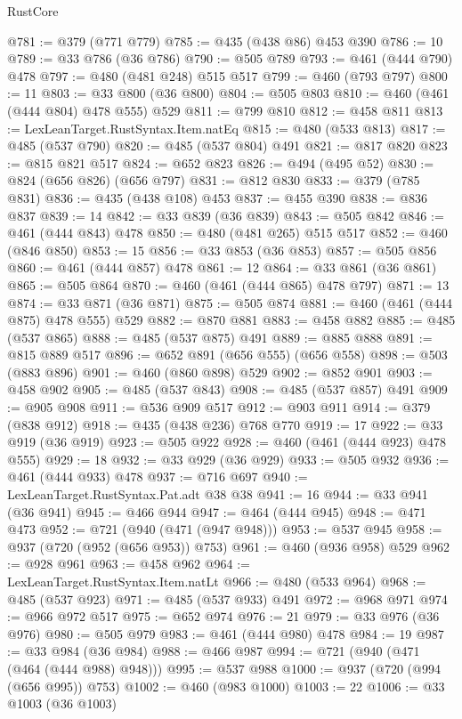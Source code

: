 \begin{lexlean}{RustCore}
\begin{coremodule}
@781 := @379 (@771 @779)
@785 := @435 (@438 @86) @453 @390
@786 := 10
@789 := @33 @786 (@36 @786)
@790 := @505 @789
@793 := @461 (@444 @790) @478
@797 := @480 (@481 @248) @515 @517
@799 := @460 (@793 @797)
@800 := 11
@803 := @33 @800 (@36 @800)
@804 := @505 @803
@810 := @460 (@461 (@444 @804) @478 @555) @529
@811 := @799 @810
@812 := @458 @811
@813 := LexLeanTarget.RustSyntax.Item.natEq
@815 := @480 (@533 @813)
@817 := @485 (@537 @790)
@820 := @485 (@537 @804) @491
@821 := @817 @820
@823 := @815 @821 @517
@824 := @652 @823
@826 := @494 (@495 @52)
@830 := @824 (@656 @826) (@656 @797)
@831 := @812 @830
@833 := @379 (@785 @831)
@836 := @435 (@438 @108) @453
@837 := @455 @390
@838 := @836 @837
@839 := 14
@842 := @33 @839 (@36 @839)
@843 := @505 @842
@846 := @461 (@444 @843) @478
@850 := @480 (@481 @265) @515 @517
@852 := @460 (@846 @850)
@853 := 15
@856 := @33 @853 (@36 @853)
@857 := @505 @856
@860 := @461 (@444 @857) @478
@861 := 12
@864 := @33 @861 (@36 @861)
@865 := @505 @864
@870 := @460 (@461 (@444 @865) @478 @797)
@871 := 13
@874 := @33 @871 (@36 @871)
@875 := @505 @874
@881 := @460 (@461 (@444 @875) @478 @555) @529
@882 := @870 @881
@883 := @458 @882
@885 := @485 (@537 @865)
@888 := @485 (@537 @875) @491
@889 := @885 @888
@891 := @815 @889 @517
@896 := @652 @891 (@656 @555) (@656 @558)
@898 := @503 (@883 @896)
@901 := @460 (@860 @898) @529
@902 := @852 @901
@903 := @458 @902
@905 := @485 (@537 @843)
@908 := @485 (@537 @857) @491
@909 := @905 @908
@911 := @536 @909 @517
@912 := @903 @911
@914 := @379 (@838 @912)
@918 := @435 (@438 @236) @768 @770
@919 := 17
@922 := @33 @919 (@36 @919)
@923 := @505 @922
@928 := @460 (@461 (@444 @923) @478 @555)
@929 := 18
@932 := @33 @929 (@36 @929)
@933 := @505 @932
@936 := @461 (@444 @933) @478
@937 := @716 @697
@940 := LexLeanTarget.RustSyntax.Pat.adt @38 @38
@941 := 16
@944 := @33 @941 (@36 @941)
@945 := @466 @944
@947 := @464 (@444 @945)
@948 := @471 @473
@952 := @721 (@940 (@471 (@947 @948)))
@953 := @537 @945
@958 := @937 (@720 (@952 (@656 @953)) @753)
@961 := @460 (@936 @958) @529
@962 := @928 @961
@963 := @458 @962
@964 := LexLeanTarget.RustSyntax.Item.natLt
@966 := @480 (@533 @964)
@968 := @485 (@537 @923)
@971 := @485 (@537 @933) @491
@972 := @968 @971
@974 := @966 @972 @517
@975 := @652 @974
@976 := 21
@979 := @33 @976 (@36 @976)
@980 := @505 @979
@983 := @461 (@444 @980) @478
@984 := 19
@987 := @33 @984 (@36 @984)
@988 := @466 @987
@994 := @721 (@940 (@471 (@464 (@444 @988) @948)))
@995 := @537 @988
@1000 := @937 (@720 (@994 (@656 @995)) @753)
@1002 := @460 (@983 @1000)
@1003 := 22
@1006 := @33 @1003 (@36 @1003)

\end{coremodule}
\end{lexlean}
